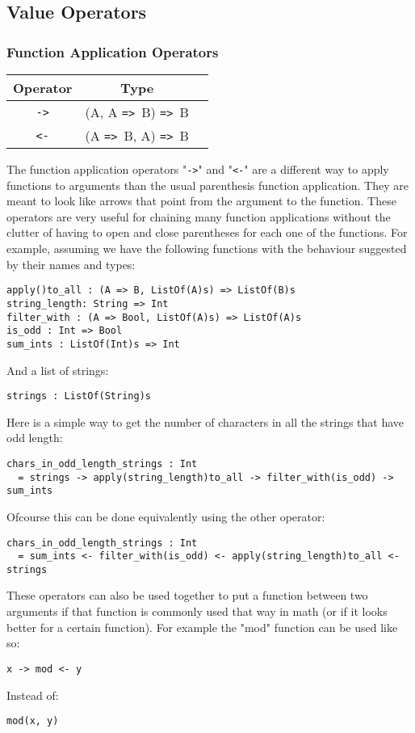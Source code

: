 \documentclass{article}
\def\ra{\texttt{=>}\ }
\begin{document}
\subsection{Value Operators}

\subsubsection{Function Application Operators}

\begin{center}
\begin{tabular}{ |c|c|c| } 
\hline
Operator & Type \\ 
\hline
\hline
\texttt{->} & (A, A \ra B) \ra B \\
\hline
\texttt{<-} & (A \ra B, A) \ra B \\
\hline
\end{tabular}
\end{center}
The function application operators "\texttt{->}" and "\texttt{<-}" are a
different way to apply functions to arguments than the usual parenthesis
function application.  They are meant to look like arrows that point from the
argument to the function.  These operators are very useful for chaining many
function applications without the clutter of having to open and close
parentheses for each one of the functions.  For example, assuming we have the
following functions with the behaviour suggested by their names and types:
\begin{verbatim}
apply()to_all : (A => B, ListOf(A)s) => ListOf(B)s
string_length: String => Int
filter_with : (A => Bool, ListOf(A)s) => ListOf(A)s
is_odd : Int => Bool
sum_ints : ListOf(Int)s => Int
\end{verbatim}
And a list of strings:
\begin{verbatim}
strings : ListOf(String)s
\end{verbatim}
Here is a simple way to get the number of characters in all the strings that have 
odd length:
\begin{verbatim}
chars_in_odd_length_strings : Int
  = strings -> apply(string_length)to_all -> filter_with(is_odd) -> sum_ints
\end{verbatim}
Ofcourse this can be done equivalently using the other operator:
\begin{verbatim}
chars_in_odd_length_strings : Int
  = sum_ints <- filter_with(is_odd) <- apply(string_length)to_all <- strings

\end{verbatim}
These operators can also be used together to put a function between two arguments
if that function is commonly used that way in math (or if it looks better for a
certain function). For example the "mod" function can be used like so:
\begin{center}
\texttt{x -> mod <- y}
\end{center}
Instead of:
\begin{center}
\texttt{mod(x, y)}
\end{center}
\end{document}
